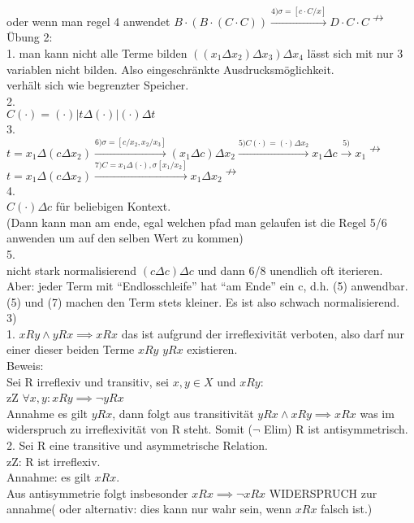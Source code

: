 \documentclass{article}
\newcommand{\nto}{\nrightarrow}
\begin{document}
	oder wenn man regel 4 anwendet $B\cdot (B\cdot (C\cdot C))\stackrel{4) \sigma=[c\cdot C/x]}{\to} D\cdot C\cdot C\nto$\\
	Übung 2:\\
	1. man kann nicht alle Terme bilden $((x_1\Delta x_2)\Delta x_3) \Delta x_4$ lässt sich mit nur 3 variablen nicht bilden. Also eingeschränkte Ausdrucksmöglichkeit.\\
	verhält sich wie begrenzter Speicher.\\
	2.\\
	$C(\cdot) = (\cdot)| t\Delta (\cdot)|(\cdot)\Delta t$\\
	3.\\
	$t=x_1\Delta (c\Delta x_2)\stackrel{6) \sigma=[c/x_2,x_2/x_3]}{\to} (x_1\Delta c)\Delta x_2\stackrel{5) C(\cdot)=(\cdot)\Delta x_2}{\to}x_1\Delta c\stackrel{5)}{\to} x_1 \nto$\\
	$t=x_1\Delta (c\Delta x_2)\stackrel{7) C=x_1\Delta (\cdot),\sigma[x_1/x_2]}{\to} x_1\Delta x_2\nto$\\
	4.\\
	$C(\cdot)\Delta c$ für beliebigen Kontext.\\
	(Dann kann man am ende, egal welchen pfad man gelaufen ist die Regel 5/6 anwenden um auf den selben Wert zu kommen)\\
	5.\\
	nicht stark normalisierend $(c\Delta c)\Delta c$ und dann 6/8 unendlich oft iterieren.\\
	Aber: jeder Term mit ``Endlosschleife'' hat  ``am Ende'' ein c, d.h. (5) anwendbar. (5) und (7) machen den Term stets kleiner. Es ist also schwach normalisierend.\\
	3)\\
	1. $xRy\land yRx\implies xRx$ das ist aufgrund der irreflexivität verboten, also darf nur einer dieser beiden Terme $xRy$ $yRx$ existieren.\\
	Beweis:\\
	Sei R irreflexiv und transitiv, sei $x,y\in X $ und $xRy$:\\
	zZ $\forall x,y: xRy\implies \lnot yRx$\\
	Annahme es gilt $yRx$, dann folgt aus transitivität $yRx\land xRy\implies xRx$ was im widerspruch zu irreflexivität von R steht. Somit ($\lnot$ Elim) R ist antisymmetrisch.\\
	2. Sei R eine transitive und asymmetrische Relation.\\
	zZ: R ist irreflexiv.\\
	Annahme: es gilt $xRx$.\\
	Aus antisymmetrie folgt insbesonder $xRx\implies \lnot xRx$ WIDERSPRUCH zur annahme( oder alternativ: dies kann nur wahr sein, wenn $xRx$ falsch ist.)\\
\end{document}
